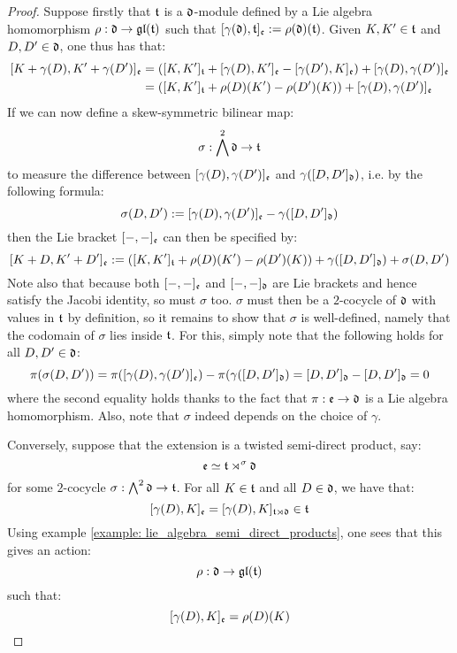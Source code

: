             \begin{proof}
                Suppose firstly that $\mathfrak{t}$ is a $\mathfrak{d}$-module defined by a Lie algebra homomorphism $\rho: \mathfrak{d} \to \mathfrak{gl}(\mathfrak{t})$ such that $[\gamma(\mathfrak{d}), \mathfrak{t}]_{\mathfrak{e}} := \rho(\mathfrak{d})(\mathfrak{t})$. Given $K, K' \in \mathfrak{t}$ and $D, D' \in \mathfrak{d}$, one thus has that:
                    $$
                        \begin{aligned}
                            [ K + \gamma(D), K' + \gamma(D') ]_{\frake} & = ( [K, K']_{\t} + [\gamma(D), K']_{\frake} - [\gamma(D'), K]_{\frake} ) + [\gamma(D), \gamma(D')]_{\frake}
                            \\
                            & = ( [K, K']_{\t} + \rho(D)(K') - \rho(D')(K) ) + [\gamma(D), \gamma(D')]_{\frake}
                        \end{aligned}
                    $$
                If we can now define a skew-symmetric bilinear map:
                    $$\sigma: \bigwedge^2 \mathfrak{d} \to \mathfrak{t}$$
                to measure the difference between $[\gamma(D), \gamma(D')]_{\mathfrak{e}}$ and $\gamma([D, D']_{\mathfrak{d}})$, i.e. by the following formula:
                    $$\sigma(D, D') := [\gamma(D), \gamma(D')]_{\mathfrak{e}} - \gamma( [D, D']_{\mathfrak{d}} )$$
                then the Lie bracket $[-, -]_{\mathfrak{e}}$ can then be specified by:
                    $$[ K + D, K' + D' ]_{\mathfrak{e}} := ( [K, K']_{\mathfrak{t}} + \rho(D)(K') - \rho(D')(K) ) + \gamma( [D, D']_{\mathfrak{d}} ) + \sigma(D, D')$$
                Note also that because both $[-, -]_{\mathfrak{e}}$ and $[-, -]_{\mathfrak{d}}$ are Lie brackets and hence satisfy the Jacobi identity, so must $\sigma$ too. $\sigma$ must then be a $2$-cocycle of $\mathfrak{d}$ with values in $\mathfrak{t}$ by definition, so it remains to show that $\sigma$ is well-defined, namely that the codomain of $\sigma$ lies inside $\mathfrak{t}$. For this, simply note that the following holds for all $D, D' \in \mathfrak{d}$:
                    $$\pi( \sigma(D, D') ) = \pi( [\gamma(D), \gamma(D')]_{\mathfrak{e}} ) - \pi( \gamma( [D, D']_{\mathfrak{d}} ) = [D, D']_{\mathfrak{d}} - [D, D']_{\mathfrak{d}} = 0$$
                where the second equality holds thanks to the fact that $\pi: \mathfrak{e} \to \mathfrak{d}$ is a Lie algebra homomorphism. Also, note that $\sigma$ indeed depends on the choice of $\gamma$.

                Conversely, suppose that the extension is a twisted semi-direct product, say:
                    $$\mathfrak{e} \simeq \mathfrak{t} \rtimes^{\sigma} \mathfrak{d}$$
                for some $2$-cocycle $\sigma: \bigwedge^2 \mathfrak{d} \to \mathfrak{t}$. For all $K \in \mathfrak{t}$ and all $D \in \mathfrak{d}$, we have that:
                    $$[\gamma(D), K]_{\mathfrak{e}} = [\gamma(D), K]_{\mathfrak{t} \rtimes \mathfrak{d}} \in \mathfrak{t}$$
                Using example \ref{example: lie_algebra_semi_direct_products}, one sees that this gives an action:
                    $$\rho: \mathfrak{d} \to \mathfrak{gl}(\mathfrak{t})$$
                such that:
                    $$[\gamma(D), K]_{\mathfrak{e}} = \rho(D)(K)$$
            \end{proof}
